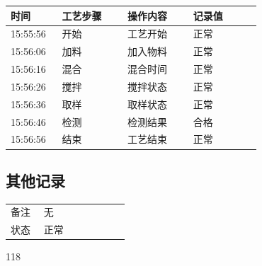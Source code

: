 \documentclass[UTF8,10pt,a4paper,fontset=fandol]{ctexart}
\newcommand{\fieldvalue}[1]{#1}
\newcommand{\handwritten}[1]{#1}
\begin{document}
\begin{tabular}{@{}p{0.18\linewidth}p{0.23\linewidth}p{0.23\linewidth}p{0.24\linewidth}@{}}
\textbf{时间} & \textbf{工艺步骤} & \textbf{操作内容} & \textbf{记录值} \\ \hline
15:55:56 &
\fieldvalue{开始} &
工艺开始 &
\fieldvalue{正常}
\\
15:56:06 &
\fieldvalue{加料} &
加入物料 &
\fieldvalue{正常}
\\
15:56:16 &
\fieldvalue{混合} &
混合时间 &
\fieldvalue{正常}
\\
15:56:26 &
\fieldvalue{搅拌} &
搅拌状态 &
\fieldvalue{正常}
\\
15:56:36 &
\fieldvalue{取样} &
取样状态 &
\fieldvalue{正常}
\\
15:56:46 &
\fieldvalue{检测} &
检测结果 &
\fieldvalue{合格}
\\
15:56:56 &
\fieldvalue{结束} &
工艺结束 &
\fieldvalue{正常}
\end{tabular}

\vspace{1em}

\subsection*{其他记录}

\begin{tabular}{@{}p{0.25\linewidth}p{0.65\linewidth}@{}}
备注 &
\fieldvalue{无}
\\
状态 &
\fieldvalue{正常}
\end{tabular}

\handwritten{118}
\end{document}
